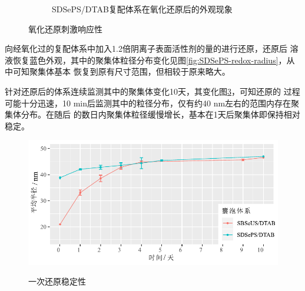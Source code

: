 \documentclass[bachelor,fandolfonts,replaceperiod]{jnuthesis}
\begin{document}
\begin{figure}[htbp]
\begin{subfigure}[]{.5\textwidth}
            \caption{SDSePS/DTAB复配体系在氧化还原后的外观现象}\label{fig:scheme-SDSePS-redox}
        \end{subfigure}%
        \caption{氧化还原刺激响应性}
        \label{fig:氧化还原刺激响应性}
    \end{figure}
    
    向经氧化过的复配体系中加入1.2倍阴离子表面活性剂的量的进行还原，还原后
    溶液恢复蓝色外观，其中的聚集体粒径分布变化见图\ref{fig:SDSePS-redox-radius}，从中可知聚集体基本
    恢复到原有尺寸范围，但相较于原来略大。
    
    针对还原后的体系连续监测其中的聚集体变化10天，其变化图\ref{fig:vesicle-Re-stability}，可知还原的
    过程可能十分迅速，10 min后监测其中的粒径分布，仅有约40 nm左右的范围内存在聚集体分布。在随后
    的数日内聚集体粒径缓慢增长，基本在1天后聚集体即保持相对稳定。
    
    \begin{figure}[htbp]
        \centering
        \includegraphics[width=.76\textwidth]{figure/vesicle-Re-stability.pdf}\\
        \caption{一次还原稳定性}\label{fig:vesicle-Re-stability}
    \end{figure}
    
\end{document}
